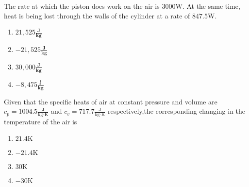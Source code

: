 \item The rate at which the piston does work on the air is $3000\text{W}.$ At the same time, heat is being lost through the walls of the cylinder at a rate of $847.5\text{W}.$
\begin{multicols}{4}
    \begin{enumerate}
        \item $21,525\frac{\textbf{J}}{\textbf{kg}}$
        \item $-21,525\frac{\textbf{J}}{\textbf{kg}}$
        \item $30,000\frac{\textbf{J}}{\textbf{kg}}$
        \item $-8,475\frac{\textbf{j}}{\textbf{kg}}$        
    \end{enumerate}
\end{multicols}
\bigskip
\item Given that the specific heats of air at constant pressure and volume are $c_{p}=1004.5\frac{\text{J}}{\text{kg-K}}$ and $c_{v}=717.7\frac{\text{J}}{\text{kg-K}}$ respectively,the corresponding  changing in the temperature of the air is 
\begin{multicols}{4}
    \begin{enumerate}
        \item $21.4\text{K}$
        \item $-21.4\text{K}$
        \item $30\text{K}$
        \item $-30\text{K}$        
    \end{enumerate}
\end{multicols}


